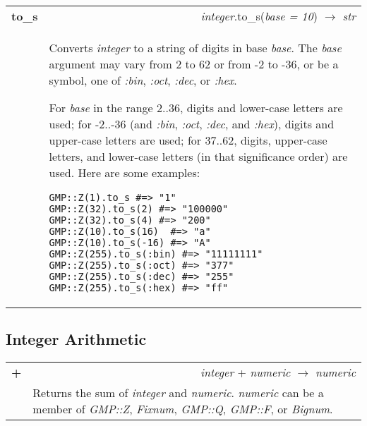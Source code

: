 \documentclass[pdftex,10pt]{article}
\newlength{\methwidth}
\newlength{\defnwidth}
\def\qquad{\quad\quad}
\def\qqqquad{\quad\quad\quad\quad}
\begin{document}
\begin{tabular}{p{\methwidth} l r}
\toprule
\textbf{to\_s} & & \textit{integer}.to\_s(\textit{base = 10}) $\rightarrow$ \textit{str} \\
\cmidrule(r){2-3}
& \multicolumn{2}{p{\defnwidth}}{
  Converts \textit{integer} to a string of digits in base \textit{base}. The
  \textit{base} argument may vary from 2 to 62 or from -2 to -36, or be a symbol, one of
  \textit{:bin}, \textit{:oct}, \textit{:dec}, or \textit{:hex}.
  \newline
  
  For \textit{base} in the range 2..36, digits and lower-case letters are used; for
  -2..-36 (and \textit{:bin}, \textit{:oct}, \textit{:dec}, and \textit{:hex}), digits
  and upper-case letters are used; for 37..62, digits, upper-case letters, and lower-case
  letters (in that significance order) are used. Here are some
  examples:\newline
  
  \texttt{GMP::Z(1).to\_s \qqqquad \#=> "1" \newline
          GMP::Z(32).to\_s(2) \qquad \#=> "100000" \newline
          GMP::Z(32).to\_s(4) \qquad \#=> "200" \newline
          GMP::Z(10).to\_s(16) \quad\  \#=> "a" \newline
          GMP::Z(10).to\_s(-16) \quad \#=> "A" \newline
          GMP::Z(255).to\_s(:bin) \#=> "11111111" \newline
          GMP::Z(255).to\_s(:oct) \#=> "377" \newline
          GMP::Z(255).to\_s(:dec) \#=> "255" \newline
          GMP::Z(255).to\_s(:hex) \#=> "ff"}
}
\end{tabular}

\subsection{Integer Arithmetic}

\begin{tabular}{p{\methwidth} l r}
\toprule
\textbf{+} & & \textit{integer} + \textit{numeric} $\rightarrow$ \textit{numeric} \\
\cmidrule(r){2-3}
& \multicolumn{2}{p{\defnwidth}}{
  Returns the sum of \textit{integer} and \textit{numeric}. \textit{numeric} can be a
  member of \textit{GMP::Z}, \textit{Fixnum}, \textit{GMP::Q}, \textit{GMP::F}, or
  \textit{Bignum}.
}
\end{tabular}
\newline\newline
\end{document}
